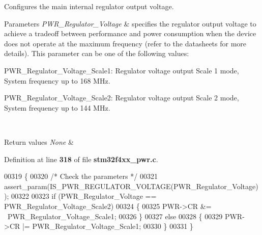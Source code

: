 Configures the main internal regulator output voltage. 


\begin{DoxyParams}{Parameters}
{\em P\+W\+R\+\_\+\+Regulator\+\_\+\+Voltage} & specifies the regulator output voltage to achieve a tradeoff between performance and power consumption when the device does not operate at the maximum frequency (refer to the datasheets for more details). This parameter can be one of the following values\+: \begin{DoxyItemize}
\item P\+W\+R\+\_\+\+Regulator\+\_\+\+Voltage\+\_\+\+Scale1\+: Regulator voltage output Scale 1 mode, System frequency up to 168 M\+Hz. \item P\+W\+R\+\_\+\+Regulator\+\_\+\+Voltage\+\_\+\+Scale2\+: Regulator voltage output Scale 2 mode, System frequency up to 144 M\+Hz. \end{DoxyItemize}
\\
\hline
\end{DoxyParams}

\begin{DoxyRetVals}{Return values}
{\em None} & \\
\hline
\end{DoxyRetVals}


Definition at line \textbf{ 318} of file \textbf{ stm32f4xx\+\_\+pwr.\+c}.


\begin{DoxyCode}
00319 \{
00320   \textcolor{comment}{/* Check the parameters */}
00321   assert_param(IS_PWR_REGULATOR_VOLTAGE(PWR\_Regulator\_Voltage));
00322 
00323   \textcolor{keywordflow}{if} (PWR\_Regulator\_Voltage == PWR_Regulator_Voltage_Scale2)
00324   \{
00325     PWR->CR &= ~PWR_Regulator_Voltage_Scale1;
00326   \}
00327   \textcolor{keywordflow}{else}
00328   \{    
00329     PWR->CR |= PWR_Regulator_Voltage_Scale1;
00330   \}
00331 \}
\end{DoxyCode}
